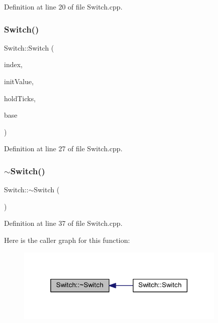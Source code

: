 Definition at line 20 of file Switch.\+cpp.

\mbox{\label{class_switch_aeccf02d441097b52da2f6b0ee16c7acd}} 
\subsubsection{\texorpdfstring{Switch()}{Switch()}\hspace{0.1cm}{\footnotesize\ttfamily [3/3]}}
{\footnotesize\ttfamily Switch\+::\+Switch (\begin{DoxyParamCaption}\item[{unsigned char}]{index,  }\item[{unsigned char}]{init\+Value,  }\item[{unsigned int}]{hold\+Ticks,  }\item[{\hyperlink{class_switch_base}{Switch\+Base} $\ast$}]{base }\end{DoxyParamCaption})}



Definition at line 27 of file Switch.\+cpp.

\mbox{\label{class_switch_ac9e0d5810af5ea21572d5dd7248baed8}} 
\subsubsection{\texorpdfstring{$\sim$\+Switch()}{~Switch()}}
{\footnotesize\ttfamily Switch\+::$\sim$\+Switch (\begin{DoxyParamCaption}{ }\end{DoxyParamCaption})}



Definition at line 37 of file Switch.\+cpp.

Here is the caller graph for this function\+:
\nopagebreak
\begin{figure}[H]
\begin{center}
\leavevmode
\includegraphics[width=284pt]{d9/d47/class_switch_ac9e0d5810af5ea21572d5dd7248baed8_icgraph}
\end{center}
\end{figure}


